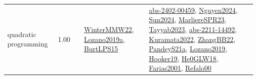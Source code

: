{\begin{longtable}{p{3cm}r>{\raggedright\arraybackslash}p{6cm}>{\raggedright\arraybackslash}p{6cm}>{\raggedright\arraybackslash}p{8cm}}
\index{quadratic programming}\index{Algorithms!quadratic programming}quadratic programming &  1.00 &  & \hyperref[detail:WinterMMW22]{WinterMMW22}, \hyperref[detail:Lozano2019a]{Lozano2019a}, \hyperref[detail:BurtLPS15]{BurtLPS15} & \hyperref[detail:abs-2402-00459]{abs-2402-00459}, \hyperref[detail:Nguyen2024]{Nguyen2024}, \hyperref[detail:Sun2024]{Sun2024}, \hyperref[detail:MarliereSPR23]{MarliereSPR23}, \hyperref[detail:Tayyab2023]{Tayyab2023}, \hyperref[detail:abs-2211-14492]{abs-2211-14492}, \hyperref[detail:Kuramata2022]{Kuramata2022}, \hyperref[detail:ZhangBB22]{ZhangBB22}, \hyperref[detail:PandeyS21a]{PandeyS21a}, \hyperref[detail:Lozano2019]{Lozano2019}, \hyperref[detail:Hooker19]{Hooker19}, \hyperref[detail:He0GLW18]{He0GLW18}, \hyperref[detail:Farias2001]{Farias2001}, \hyperref[detail:Refalo00]{Refalo00}\\

\end{longtable}}
